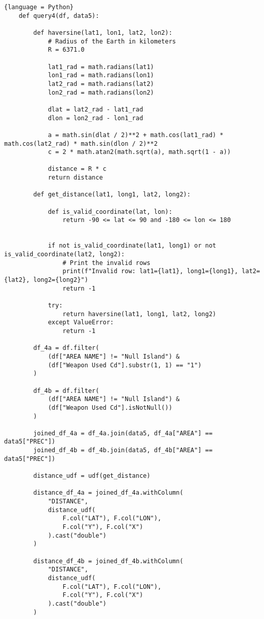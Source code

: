 \documentclass{article}
\begin{document}
\begin{lstlisting}{language = Python}
    def query4(df, data5):

        def haversine(lat1, lon1, lat2, lon2):
            # Radius of the Earth in kilometers
            R = 6371.0

            lat1_rad = math.radians(lat1)
            lon1_rad = math.radians(lon1)
            lat2_rad = math.radians(lat2)
            lon2_rad = math.radians(lon2)

            dlat = lat2_rad - lat1_rad
            dlon = lon2_rad - lon1_rad

            a = math.sin(dlat / 2)**2 + math.cos(lat1_rad) * math.cos(lat2_rad) * math.sin(dlon / 2)**2
            c = 2 * math.atan2(math.sqrt(a), math.sqrt(1 - a))

            distance = R * c
            return distance

        def get_distance(lat1, long1, lat2, long2):

            def is_valid_coordinate(lat, lon):
                return -90 <= lat <= 90 and -180 <= lon <= 180


            if not is_valid_coordinate(lat1, long1) or not is_valid_coordinate(lat2, long2):
                # Print the invalid rows
                print(f"Invalid row: lat1={lat1}, long1={long1}, lat2={lat2}, long2={long2}")
                return -1

            try:
                return haversine(lat1, long1, lat2, long2)
            except ValueError:
                return -1

        df_4a = df.filter(
            (df["AREA NAME"] != "Null Island") &
            (df["Weapon Used Cd"].substr(1, 1) == "1")
        )

        df_4b = df.filter(
            (df["AREA NAME"] != "Null Island") &
            (df["Weapon Used Cd"].isNotNull())
        )

        joined_df_4a = df_4a.join(data5, df_4a["AREA"] == data5["PREC"])
        joined_df_4b = df_4b.join(data5, df_4b["AREA"] == data5["PREC"])

        distance_udf = udf(get_distance)

        distance_df_4a = joined_df_4a.withColumn(
            "DISTANCE",
            distance_udf(
                F.col("LAT"), F.col("LON"),
                F.col("Y"), F.col("X")
            ).cast("double")
        )

        distance_df_4b = joined_df_4b.withColumn(
            "DISTANCE",
            distance_udf(
                F.col("LAT"), F.col("LON"),
                F.col("Y"), F.col("X")
            ).cast("double")
        )


\end{lstlisting}
\end{document}

